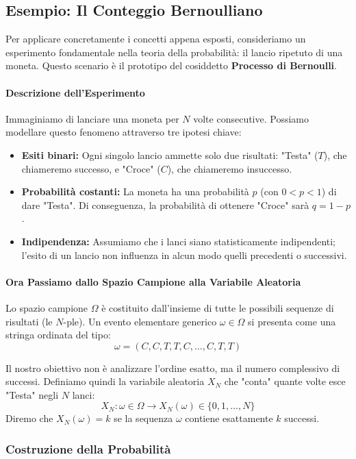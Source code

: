 \subsection{Esempio: Il Conteggio Bernoulliano}

Per applicare concretamente i concetti appena esposti, consideriamo un esperimento fondamentale nella teoria della probabilità: il lancio ripetuto di una moneta. Questo scenario è il prototipo del cosiddetto \textbf{Processo di Bernoulli}.

\paragraph{Descrizione dell'Esperimento}
Immaginiamo di lanciare una moneta per $N$ volte consecutive. Possiamo modellare questo fenomeno attraverso tre ipotesi chiave:
\begin{itemize}
    \item \textbf{Esiti binari:} Ogni singolo lancio ammette solo due risultati: "Testa" ($T$), che chiameremo successo, e "Croce" ($C$), che chiameremo insuccesso.
    \item \textbf{Probabilità costanti:} La moneta ha una probabilità $p$ (con $0 < p < 1$) di dare "Testa". Di conseguenza, la probabilità di ottenere "Croce" sarà $q = 1 - p$.
    \item \textbf{Indipendenza:} Assumiamo che i lanci siano statisticamente indipendenti; l'esito di un lancio non influenza in alcun modo quelli precedenti o successivi.
\end{itemize}

\paragraph{Ora Passiamo dallo Spazio Campione alla Variabile Aleatoria}
Lo spazio campione $\Omega$ è costituito dall'insieme di tutte le possibili sequenze di risultati (le $N$-ple). Un evento elementare generico $\omega \in \Omega$ si presenta come una stringa ordinata del tipo:
\[ \omega = (C, C, T, T, C, \dots, C, T, T) \]

Il nostro obiettivo non è analizzare l'ordine esatto, ma il numero complessivo di successi. Definiamo quindi la variabile aleatoria $X_N$ che "conta" quante volte esce "Testa" negli $N$ lanci:
\[ X_N: \omega \in \Omega \longrightarrow X_N(\omega) \in \{0, 1, \dots, N\} \]
Diremo che $X_N(\omega) = k$ se la sequenza $\omega$ contiene esattamente $k$ successi.


\subsubsection{Costruzione della Probabilità}

